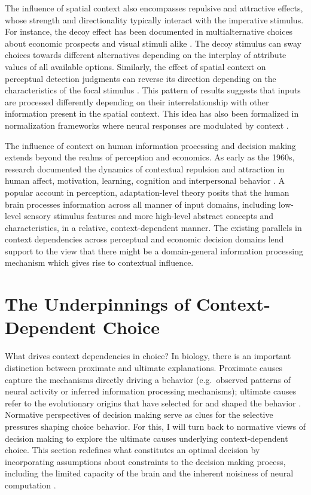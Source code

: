 \documentclass[a4paper, nobind]{templates/ociamthesis}
\begin{document}
The influence of spatial context also encompasses repulsive and attractive effects, whose strength and directionality typically interact with the imperative stimulus. For instance, the decoy effect has been documented in multialternative choices about economic prospects and visual stimuli alike \autocite{trueblood2013}. The decoy stimulus can sway choices towards different alternatives depending on the interplay of attribute values of all available options. Similarly, the effect of spatial context on perceptual detection judgments can reverse its direction depending on the characteristics of the focal stimulus \autocite{stemmler1995}. This pattern of results suggests that inputs are processed differently depending on their interrelationship with other information present in the spatial context. This idea has also been formalized in normalization frameworks where neural responses are modulated by context \autocite{xing2001,daviet2021}.

The influence of context on human information processing and decision making extends beyond the realms of perception and economics. As early as the 1960s, research documented the dynamics of contextual repulsion and attraction in human affect, motivation, learning, cognition and interpersonal behavior \autocite{helson1964}. A popular account in perception, adaptation-level theory posits that the human brain processes information across all manner of input domains, including low-level sensory stimulus features and more high-level abstract concepts and characteristics, in a relative, context-dependent manner. The existing parallels in context dependencies across perceptual and economic decision domains lend support to the view that there might be a domain-general information processing mechanism which gives rise to contextual influence.

\hypertarget{the-underpinnings-of-context-dependent-choice}{%
\section{The Underpinnings of Context-Dependent Choice}\label{the-underpinnings-of-context-dependent-choice}}

What drives context dependencies in choice? In biology, there is an important distinction between proximate and ultimate explanations. Proximate causes capture the mechanisms directly driving a behavior (e.g.~observed patterns of neural activity or inferred information processing mechanisms); ultimate causes refer to the evolutionary origins that have selected for and shaped the behavior \autocite{davies2012}. Normative perspectives of decision making serve as clues for the selective pressures shaping choice behavior. For this, I will turn back to normative views of decision making to explore the ultimate causes underlying context-dependent choice. This section redefines what constitutes an optimal decision by incorporating assumptions about constraints to the decision making process, including the limited capacity of the brain \autocite{sims2003} and the inherent noisiness of neural computation \autocite{tsetsos2016}.
\end{document}
